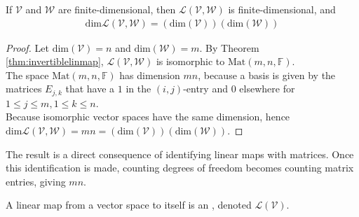 \begin{proposition} If $\mathcal{V}$ and $\mathcal{W}$ are finite-dimensional, then $\mathcal{L}(\mathcal{V}, \mathcal{W})$ is finite-dimensional, and
\begin{align}
\text{dim}\mathcal{L}(\mathcal{V}, \mathcal{W}) = (\text{dim}(\mathcal{V}))(\text{dim}(\mathcal{W})) \nonumber
\end{align}
\begin{proof} Let $\text{dim}(\mathcal{V}) = n$ and $\text{dim}(\mathcal{W}) = m$. By Theorem \ref{thm:invertiblelinmap}, $\mathcal{L}(\mathcal{V}, \mathcal{W})$ is isomorphic to $\text{Mat}(m,n,\mathbb{F})$.\\
The space $\text{Mat}(m,n,\mathbb{F})$ has dimension $mn$, because a basis is given by the matrices $E_{j,k}$ that have a $1$ in the $(i,j)$-entry and $0$ elsewhere for $1 \leq j \leq m, 1 \leq k \leq n$.\\
Because isomorphic vector spaces have the same dimension, hence $\text{dim}\mathcal{L}(\mathcal{V}, \mathcal{W}) = mn = (\text{dim}(\mathcal{V}))(\text{dim}(\mathcal{W}))$.
\end{proof}
\end{proposition}

The result is a direct consequence of identifying linear maps with matrices. Once this identification is made, counting degrees of freedom becomes counting matrix entries, giving $mn$.

\begin{definition} A linear map from a vector space to itself is an , denoted $\mathcal{L}(\mathcal{V})$.
\end{definition}

